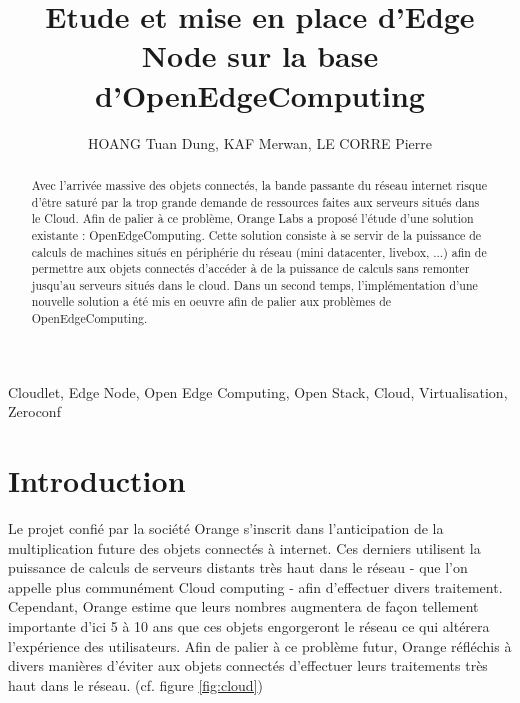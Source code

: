\documentclass[twocolumn,a4paper]{IEEEtranfr}
\begin{document}
\title{Etude et mise en place d'Edge Node sur la base d'OpenEdgeComputing}
\author{HOANG Tuan Dung, KAF Merwan, LE CORRE Pierre} 

\maketitle

\begin{abstract}
Avec l’arrivée massive des objets connectés, la bande passante du réseau internet risque d'être saturé par la trop grande demande de ressources faites aux serveurs situés dans le Cloud. Afin de palier à ce problème, Orange Labs a proposé l’étude d’une solution existante : OpenEdgeComputing. Cette solution consiste à se servir de la puissance de calculs de machines situés en périphérie du réseau (mini datacenter, livebox, ...) afin de permettre aux objets connectés d'accéder à de la puissance de calculs sans remonter jusqu'au serveurs situés dans le cloud. Dans un second temps, l'implémentation d'une nouvelle solution a été mis en oeuvre afin de palier aux problèmes de OpenEdgeComputing.

\end{abstract} 

\begin{keywords}
Cloudlet, Edge Node, Open Edge Computing, Open Stack, Cloud, Virtualisation, Zeroconf
\end{keywords}



\section{Introduction}

Le projet confié par la société Orange s’inscrit dans l’anticipation de la multiplication future des objets connectés à internet. Ces derniers utilisent la puissance de calculs de serveurs distants très haut dans le réseau - que l’on appelle plus communément Cloud computing - afin d’effectuer divers traitement. Cependant, Orange estime que leurs nombres augmentera de façon tellement importante d’ici 5 à 10 ans que ces objets engorgeront le réseau ce qui altérera l’expérience des utilisateurs. Afin de palier à ce problème futur, Orange réfléchis à divers manières d’éviter aux objets connectés d’effectuer leurs traitements très haut dans le réseau. (cf. figure \ref{fig:cloud})
\end{document}
